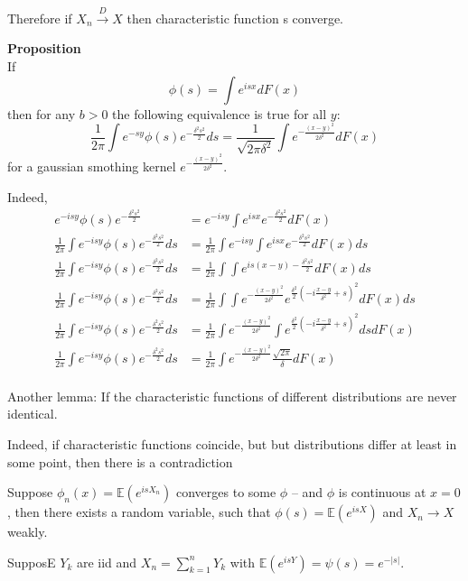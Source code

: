 \documentclass[a4paper]{article}
\newcommand{\brac}[1]{{\left ( #1 \right )}}
\newcommand{\abs}[1]{{\left | #1 \right |}}
\newcommand{\Ex}{\mathbb{E}}
\begin{document}
Therefore if $X_n\overset{D}{\to} X$ then characteristic function s converge.



\noindent\textbf{Proposition} \hfill\\
If
\[\phi(s) = \int e^{isx} dF(x)\]
then for any $b>0$ the following equivalence is true for all $y$:
\[\frac{1}{2\pi}\int e^{-sy} \phi(s) e^{-\frac{\delta^2 s^2}{2}}ds
=\frac{1}{\sqrt{2\pi\delta^2}}\int e^{-\frac{{(x-y)}^2}{2\delta^2}}dF(x)\]
for a gaussian smothing kernel $e^{-\frac{{(x-y)}^2}{2\delta^2}}$.

Indeed, \begin{align*}
	e^{-isy}\phi(s)e^{-\frac{\delta^2 s^2}{2}} &= e^{-isy}\int e^{isx} e^{-\frac{\delta^2 s^2}{2}} dF(x)\\
	\frac{1}{2\pi}\int e^{-isy}\phi(s)e^{-\frac{\delta^2 s^2}{2}} ds &= \frac{1}{2\pi}\int e^{-isy}\int e^{isx} e^{-\frac{\delta^2 s^2}{2}} dF(x) ds\\
	\frac{1}{2\pi}\int e^{-isy}\phi(s)e^{-\frac{\delta^2 s^2}{2}} ds &= \frac{1}{2\pi}\int \int e^{is(x-y)-\frac{\delta^2 s^2}{2}} dF(x) ds\\
	\frac{1}{2\pi}\int e^{-isy}\phi(s)e^{-\frac{\delta^2 s^2}{2}} ds &= \frac{1}{2\pi}\int \int e^{-\frac{{(x-y)}^2}{2\delta^2}} e^{\frac{\delta^2}{2}\brac{-i\frac{x-y}{\delta^2}+s}^2} dF(x) ds\\
	\frac{1}{2\pi}\int e^{-isy}\phi(s)e^{-\frac{\delta^2 s^2}{2}} ds &= \frac{1}{2\pi}\int e^{-\frac{{(x-y)}^2}{2\delta^2}} \int e^{\frac{\delta^2}{2}\brac{-i\frac{x-y}{\delta^2}+s}^2} ds dF(x)\\
	\frac{1}{2\pi}\int e^{-isy}\phi(s)e^{-\frac{\delta^2 s^2}{2}} ds &= \frac{1}{2\pi}\int e^{-\frac{{(x-y)}^2}{2\delta^2}} \frac{\sqrt{2\pi}}{\delta} dF(x)\\
\end{align*}


Another lemma:
If the characteristic functions of different distributions are never identical.

Indeed, if characteristic functions coincide, but but distributions differ at least in some point, then there is a contradiction

Suppose $\phi_n(x) = \Ex\brac{e^{isX_n}}$ converges to some $\phi$ -- and $\phi$ is continuous at $x=0$, then there exists a random variable, such that $\phi(s) = \Ex\brac{e^{isX}}$ and $X_n\to X$ weakly.

SupposE $Y_k$ are iid and $X_n = \sum_{k=1}^n Y_k$ with $\Ex\brac{e^{isY}} = \psi(s) = e^{-\abs{s}}$.
\end{document}

